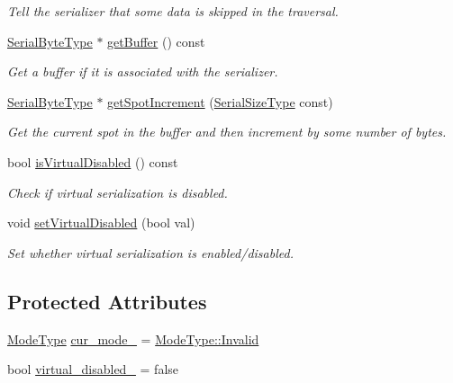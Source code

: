 \begin{DoxyCompactItemize}
\begin{DoxyCompactList}\small\item\em Tell the serializer that some data is skipped in the traversal. \end{DoxyCompactList}\item 
\hyperlink{namespacecheckpoint_ae57f01cdc0b81776c23b6c7c934c58f5}{Serial\+Byte\+Type} $\ast$ \hyperlink{structcheckpoint_1_1_base_serializer_a09da55de0edbc77e33c2a29b374ebdc1}{get\+Buffer} () const
\begin{DoxyCompactList}\small\item\em Get a buffer if it is associated with the serializer. \end{DoxyCompactList}\item 
\hyperlink{namespacecheckpoint_ae57f01cdc0b81776c23b6c7c934c58f5}{Serial\+Byte\+Type} $\ast$ \hyperlink{structcheckpoint_1_1_base_serializer_aa8c9131306f16832b72ce6abbffd825d}{get\+Spot\+Increment} (\hyperlink{namespacecheckpoint_a083f6674da3f94c2901b18c6d238217c}{Serial\+Size\+Type} const)
\begin{DoxyCompactList}\small\item\em Get the current spot in the buffer and then increment by some number of bytes. \end{DoxyCompactList}\item 
bool \hyperlink{structcheckpoint_1_1_base_serializer_a5325585631201d413d7992e8916d6f57}{is\+Virtual\+Disabled} () const
\begin{DoxyCompactList}\small\item\em Check if virtual serialization is disabled. \end{DoxyCompactList}\item 
void \hyperlink{structcheckpoint_1_1_base_serializer_ab16e2ffa62f03f8410b116c637bd4adc}{set\+Virtual\+Disabled} (bool val)
\begin{DoxyCompactList}\small\item\em Set whether virtual serialization is enabled/disabled. \end{DoxyCompactList}\end{DoxyCompactItemize}
\subsection*{Protected Attributes}
\begin{DoxyCompactItemize}
\item 
\hyperlink{namespacecheckpoint_ae2509499ccd8b1dc48fb535bf8aa3059}{Mode\+Type} \hyperlink{structcheckpoint_1_1_base_serializer_a1755296c5fbd3cdc5df3390d20c80fae}{cur\+\_\+mode\+\_\+} = \hyperlink{namespacecheckpoint_ae2509499ccd8b1dc48fb535bf8aa3059a4bbb8f967da6d1a610596d7257179c2b}{Mode\+Type\+::\+Invalid}
\item 
bool \hyperlink{structcheckpoint_1_1_base_serializer_acdffc3101eb51baafe4a13939ba23e70}{virtual\+\_\+disabled\+\_\+} = false
\end{DoxyCompactItemize}


